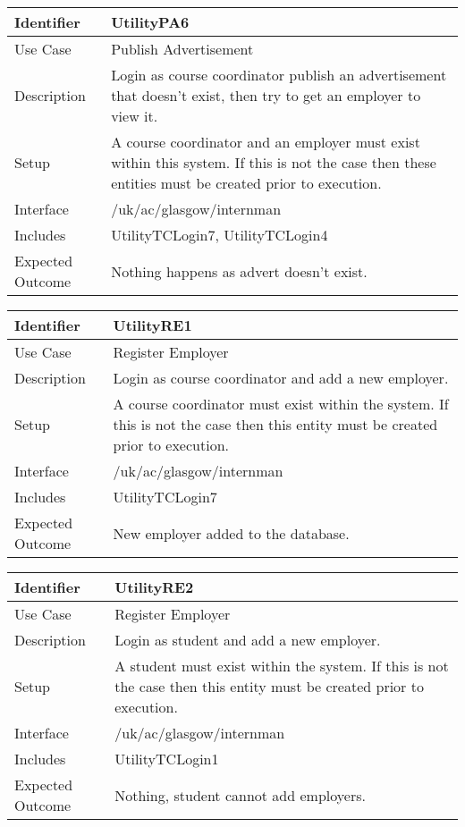 \vspace{2em}

\begin{tabularx}{\textwidth}{|T|L|}
\hline
Identifier & UtilityPA6\\
\hline
Use Case & Publish Advertisement \\
\hline
Description & Login as course coordinator publish an advertisement that
doesn't exist, then try to get an employer to view it.\\
\hline
Setup & A course coordinator and an employer must exist within this
system. If this is not the case then these entities must be created
prior to execution. \\
\hline
Interface & /uk/ac/glasgow/internman \\
\hline
Includes & UtilityTCLogin7, UtilityTCLogin4 \\
\hline
Expected Outcome & Nothing happens as advert doesn't exist.\\
\hline
\end{tabularx}

\vspace{2em}

\begin{tabularx}{\textwidth}{|T|L|}
\hline
Identifier & UtilityRE1\\
\hline
Use Case & Register Employer \\
\hline
Description & Login as course coordinator and add a new employer.\\
\hline
Setup & A course coordinator must exist within the system. If this is
not the case then this entity must be created prior to execution. \\
\hline
Interface & /uk/ac/glasgow/internman \\
\hline
Includes & UtilityTCLogin7 \\
\hline
Expected Outcome & New employer added to the database.\\
\hline
\end{tabularx}

\vspace{2em}

\begin{tabularx}{\textwidth}{|T|L|}
\hline
Identifier & UtilityRE2\\
\hline
Use Case & Register Employer \\
\hline
Description & Login as student and add a new employer.\\
\hline
Setup & A student must exist within the system. If this is not the
case then this entity must be created prior to execution.  \\
\hline
Interface & /uk/ac/glasgow/internman \\
\hline
Includes & UtilityTCLogin1 \\
\hline
Expected Outcome & Nothing, student cannot add employers.\\
\hline
\end{tabularx}


